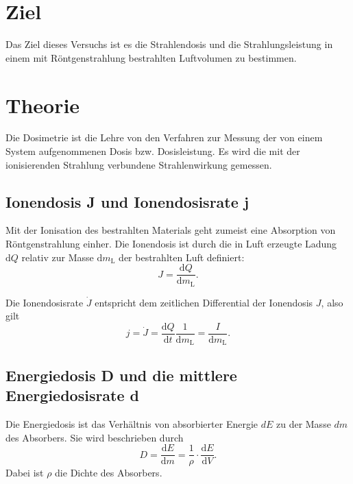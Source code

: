 \section{Ziel}
Das Ziel dieses Versuchs ist es die Strahlendosis und die
Strahlungsleistung in einem mit Röntgenstrahlung bestrahlten
Luftvolumen zu bestimmen.

\section{Theorie}
\label{sec:Theorie}

Die Dosimetrie ist die Lehre von den Verfahren zur Messung 
der von einem System aufgenommenen Dosis bzw. Dosisleistung.
Es wird die mit der ionisierenden Strahlung
verbundene Strahlenwirkung gemessen.


\subsection{Ionendosis J und Ionendosisrate j}
Mit der Ionisation des bestrahlten Materials geht zumeist
eine Absorption von Röntgenstrahlung einher. %
Die Ionendosis ist durch die in Luft erzeugte Ladung $\text{d}Q$
relativ zur Masse $\text{d}m_\text{L}$ der bestrahlten Luft definiert:
\begin{equation*}
    J = \frac{\text{d}Q}{\text{d}m_\text{L}}.
    \label{eqn:Ionendosis}
\end{equation*}

\noindent Die Ionendosisrate $\dot{J}$ entspricht dem zeitlichen Differential der Ionendosis $J$, also gilt 
\begin{equation}
    j = \dot{J} =\frac{\text{d}Q}{\text{d}t} \frac{1}{\text{d}m_\text{L}} =\frac{I}{\text{d}m_\text{L}}.
    \label{eqn:Ionendosisrate}
\end{equation}

\subsection{Energiedosis D und die mittlere Energiedosisrate d}
Die Energiedosis ist das Verhältnis von absorbierter
Energie $dE$ zu der Masse $dm$ des Absorbers.
Sie wird beschrieben durch
\begin{equation*}
    D = \frac{\text{d}E}{\text{d}m} = \frac{1}{\rho} \cdot \frac{\text{d}E}{\text{d}V}.
    \label{eqn:Energiedosis}
\end{equation*}
Dabei ist $\rho$ die Dichte des Absorbers.

